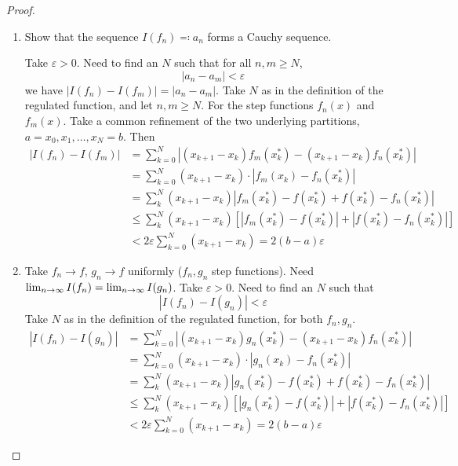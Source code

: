 \begin{proof}
    \begin{enumerate}[label = (\alph*)]
        \item Show that the sequence $I(f_n) \eqqcolon a_n$ forms a Cauchy sequence.

        Take $\varepsilon > 0$.
        Need to find an $N$ such that for all $n, m \geq N$,
        \[
        |a_n - a_m| < \varepsilon
        \]
        we have $|I(f_n) - I(f_m)| = |a_n - a_m|$.
        Take $N$ as in the definition of the regulated function,
        and let $n, m \geq N$.
        For the step functions $f_n(x)$ and $f_m(x)$.
        Take a common refinement of the two underlying partitions,
        $a = x_0, x_1, \dotsc, x_N = b$.
        Then
        \begin{align*}
            |I(f_n) - I(f_m)| &= \sum_{k = 0}^{N}|(x_{k + 1} - x_k)f_m(x_k ^ {*}) - (x_{k + 1} - x_k)f_n(x_k ^ {*})| \\
            &= \sum_{k = 0}^{N}(x_{k + 1} - x_k) \cdot |f_m(x_k) - f_n(x_k ^ {*})| \\
            &= \sum_{k}^{N}(x_{k + 1} - x_k)|f_m(x_k ^ {*}) - f(x_k ^ {*}) + f(x_k ^ {*}) - f_n(x_k ^ {*})| \\
            &\leq \sum_{k}^{N}(x_{k + 1} - x_k)\left[|f_m(x_k ^ {*}) - f(x_k ^ {*})| + |f(x_k ^ {*}) - f_n(x_k ^ {*})|\right] \\
            &< 2\varepsilon\sum_{k = 0}^{N}(x_{k + 1} - x_k) = 2(b - a)\varepsilon
        \end{align*}
    
        \item
        Take $f_n \to f$,
        $g_n \to f$ uniformly
        ($f_n, g_n$ step functions).
        Need $\lim_{n \rightarrow \infty} I(f_n) = \lim_{n \rightarrow \infty} I(g_n)$.
        Take $\varepsilon > 0$.
        Need to find an $N$ such that
        \[
        |I(f_n) - I(g_n)| < \varepsilon
        \]
        Take $N$ as in the definition of the regulated function,
        for both $f_n, g_n$.
        \begin{align*}
            |I(f_n) - I(g_n)| &= \sum_{k = 0}^{N}|(x_{k + 1} - x_k)g_n(x_k ^ {*}) - (x_{k + 1} - x_k)f_n(x_k ^ {*})| \\
            &= \sum_{k = 0}^{N}(x_{k + 1} - x_k) \cdot |g_n(x_k) - f_n(x_k ^ {*})| \\
            &= \sum_{k}^{N}(x_{k + 1} - x_k)|g_n(x_k ^ {*}) - f(x_k ^ {*}) + f(x_k ^ {*}) - f_n(x_k ^ {*})| \\
            &\leq \sum_{k}^{N}(x_{k + 1} - x_k)\left[|g_n(x_k ^ {*}) - f(x_k ^ {*})| + |f(x_k ^ {*}) - f_n(x_k ^ {*})|\right] \\
            &< 2\varepsilon\sum_{k = 0}^{N}(x_{k + 1} - x_k) = 2(b - a)\varepsilon
        \end{align*}
    \end{enumerate}
\end{proof}

